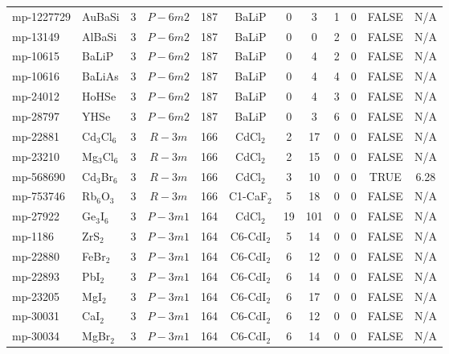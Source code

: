 {\begin{longtable}{llcccccccccc}
    mp-1227729 & AuBaSi & 3     & $P-6m2$ & 187   & BaLiP & 0     & 3     & 1     & 0     & FALSE & N/A \\
    mp-13149 & AlBaSi & 3     & $P-6m2$ & 187   & BaLiP & 0     & 0     & 2     & 0     & FALSE & N/A \\
    mp-10615 & BaLiP & 3     & $P-6m2$ & 187   & BaLiP & 0     & 4     & 2     & 0     & FALSE & N/A \\
    mp-10616 & BaLiAs & 3     & $P-6m2$ & 187   & BaLiP & 0     & 4     & 4     & 0     & FALSE & N/A \\
    mp-24012 & HoHSe & 3     & $P-6m2$ & 187   & BaLiP & 0     & 4     & 3     & 0     & FALSE & N/A \\
    mp-28797 & YHSe  & 3     & $P-6m2$ & 187   & BaLiP & 0     & 3     & 6     & 0     & FALSE & N/A \\
    mp-22881 & Cd$_{3}$Cl$_{6}$ & 3     & $R-3m$ & 166   & CdCl$_{2}$ & 2     & 17    & 0     & 0     & FALSE & N/A \\
    mp-23210 & Mg$_{3}$Cl$_{6}$ & 3     & $R-3m$ & 166   & CdCl$_{2}$ & 2     & 15    & 0     & 0     & FALSE & N/A \\
    mp-568690 & Cd$_{3}$Br$_{6}$ & 3     & $R-3m$ & 166   & CdCl$_{2}$ & 3     & 10    & 0     & 0     & TRUE  & 6.28  \\
    mp-753746 & Rb$_{6}$O$_{3}$ & 3     & $R-3m$ & 166   & C1-CaF$_{2}$ & 5     & 18    & 0     & 0     & FALSE & N/A \\
    mp-27922 & Ge$_{3}$I$_{6}$ & 3     & $P-3m1$ & 164   & CdCl$_{2}$ & 19    & 101   & 0     & 0     & FALSE & N/A \\
    mp-1186 & ZrS$_{2}$ & 3     & $P-3m1$ & 164   & C6-CdI$_{2}$ & 5     & 14    & 0     & 0     & FALSE & N/A \\
    mp-22880 & FeBr$_{2}$ & 3     & $P-3m1$ & 164   & C6-CdI$_{2}$ & 6     & 12    & 0     & 0     & FALSE & N/A \\
    mp-22893 & PbI$_{2}$ & 3     & $P-3m1$ & 164   & C6-CdI$_{2}$ & 6     & 14    & 0     & 0     & FALSE & N/A \\
    mp-23205 & MgI$_{2}$ & 3     & $P-3m1$ & 164   & C6-CdI$_{2}$ & 6     & 17    & 0     & 0     & FALSE & N/A \\
    mp-30031 & CaI$_{2}$ & 3     & $P-3m1$ & 164   & C6-CdI$_{2}$ & 6     & 12    & 0     & 0     & FALSE & N/A \\
    mp-30034 & MgBr$_{2}$ & 3     & $P-3m1$ & 164   & C6-CdI$_{2}$ & 6     & 14    & 0     & 0     & FALSE & N/A \\

\end{longtable}}
